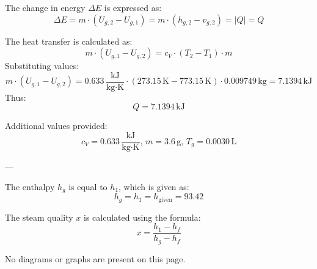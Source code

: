 The change in energy \( \Delta E \) is expressed as:  
\[
\Delta E = m \cdot (U_{g,2} - U_{g,1}) = m \cdot (h_{g,2} - v_{g,2}) = |Q| = Q
\]  

The heat transfer is calculated as:  
\[
m \cdot (U_{g,1} - U_{g,2}) = c_V \cdot (T_2 - T_1) \cdot m
\]  
Substituting values:  
\[
m \cdot (U_{g,1} - U_{g,2}) = 0.633 \, \frac{\text{kJ}}{\text{kg·K}} \cdot (273.15 \, \text{K} - 773.15 \, \text{K}) \cdot 0.009749 \, \text{kg} = 7.1394 \, \text{kJ}
\]  
Thus:  
\[
Q = 7.1394 \, \text{kJ}
\]  

Additional values provided:  
\[
c_V = 0.633 \, \frac{\text{kJ}}{\text{kg·K}}, \, m = 3.6 \, \text{g}, \, T_g = 0.0030 \, \text{L}
\]  

---

The enthalpy \( h_g \) is equal to \( h_1 \), which is given as:  
\[
h_g = h_1 = h_{\text{given}} = 93.42
\]

The steam quality \( x \) is calculated using the formula:  
\[
x = \frac{h_1 - h_f}{h_{g} - h_f}
\]  

No diagrams or graphs are present on this page.